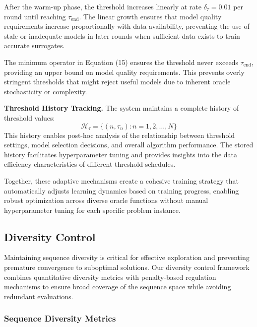 \documentclass[conference]{IEEEtran}
\begin{document}
After the warm-up phase, the threshold increases linearly at rate $\delta_{\tau} = 0.01$ per round until reaching $\tau_{\text{end}}$. The linear growth ensures that model quality requirements increase proportionally with data availability, preventing the use of stale or inadequate models in later rounds when sufficient data exists to train accurate surrogates.

The minimum operator in Equation (15) ensures the threshold never exceeds $\tau_{\text{end}}$, providing an upper bound on model quality requirements. This prevents overly stringent thresholds that might reject useful models due to inherent oracle stochasticity or complexity.

\textbf{Threshold History Tracking.} The system maintains a complete history of threshold values:
%
\begin{equation}
\mathcal{H}_{\tau} = \{(n, \tau_n) : n = 1, 2, \ldots, N\}
\end{equation}
%
This history enables post-hoc analysis of the relationship between threshold settings, model selection decisions, and overall algorithm performance. The stored history facilitates hyperparameter tuning and provides insights into the data efficiency characteristics of different threshold schedules.

Together, these adaptive mechanisms create a cohesive training strategy that automatically adjusts learning dynamics based on training progress, enabling robust optimization across diverse oracle functions without manual hyperparameter tuning for each specific problem instance.







\subsection{Diversity Control}

Maintaining sequence diversity is critical for effective exploration and preventing premature convergence to suboptimal solutions. Our diversity control framework combines quantitative diversity metrics with penalty-based regulation mechanisms to ensure broad coverage of the sequence space while avoiding redundant evaluations.

\subsubsection{Sequence Diversity Metrics}
\end{document}
